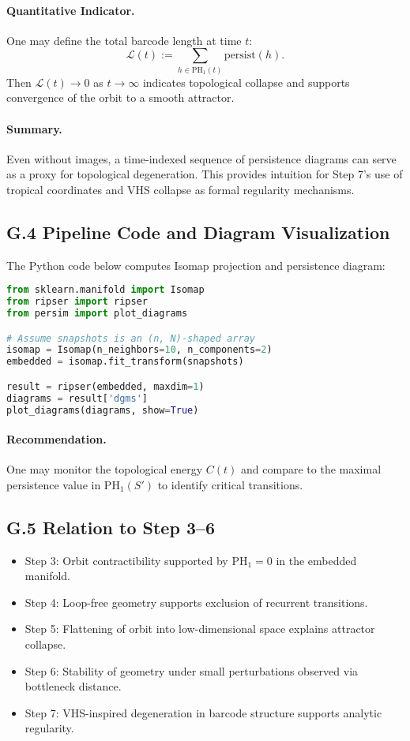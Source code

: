 \documentclass[11pt]{article}
\theoremstyle{definition}
\begin{document}
\paragraph{Quantitative Indicator.} One may define the total barcode length at time \( t \):
\[ 
\mathcal{L}(t) := \sum_{h \in \mathrm{PH}_1(t)} \text{persist}(h).
\]
Then \( \mathcal{L}(t) \to 0 \) as \( t \to \infty \) indicates topological collapse and supports convergence of the orbit to a smooth attractor.

\paragraph{Summary.} Even without images, a time-indexed sequence of persistence diagrams can serve as a proxy for topological degeneration. This provides intuition for Step 7’s use of tropical coordinates and VHS collapse as formal regularity mechanisms.

\subsection*{G.4 Pipeline Code and Diagram Visualization}

The Python code below computes Isomap projection and persistence diagram:

\begin{lstlisting}[language=Python]
from sklearn.manifold import Isomap
from ripser import ripser
from persim import plot_diagrams

# Assume snapshots is an (n, N)-shaped array
isomap = Isomap(n_neighbors=10, n_components=2)
embedded = isomap.fit_transform(snapshots)

result = ripser(embedded, maxdim=1)
diagrams = result['dgms']
plot_diagrams(diagrams, show=True)
\end{lstlisting}

\paragraph{Recommendation.} One may monitor the topological energy \( C(t) \) and compare to the maximal persistence value in \( \mathrm{PH}_1(S') \) to identify critical transitions.

\subsection*{G.5 Relation to Step 3--6}

\begin{itemize}
  \item Step 3: Orbit contractibility supported by \( \mathrm{PH}_1 = 0 \) in the embedded manifold.
  \item Step 4: Loop-free geometry supports exclusion of recurrent transitions.
  \item Step 5: Flattening of orbit into low-dimensional space explains attractor collapse.
  \item Step 6: Stability of geometry under small perturbations observed via bottleneck distance.
  \item Step 7: VHS-inspired degeneration in barcode structure supports analytic regularity.
\end{itemize}
\end{document}
